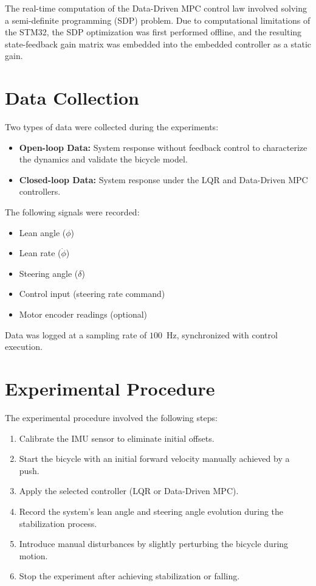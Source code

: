 The real-time computation of the Data-Driven MPC control law involved solving a semi-definite programming (SDP) problem.
Due to computational limitations of the STM32, the SDP optimization was first performed offline, and the resulting state-feedback gain matrix was embedded into the embedded controller as a static gain.

\section{Data Collection}

Two types of data were collected during the experiments:
\begin{itemize}
	\item \textbf{Open-loop Data:} System response without feedback control to characterize the dynamics and validate the bicycle model.
	\item \textbf{Closed-loop Data:} System response under the LQR and Data-Driven MPC controllers.
\end{itemize}

The following signals were recorded:
\begin{itemize}
	\item Lean angle ($\phi$)
	\item Lean rate ($\dot{\phi}$)
	\item Steering angle ($\delta$)
	\item Control input (steering rate command)
	\item Motor encoder readings (optional)
\end{itemize}

Data was logged at a sampling rate of $100$~Hz, synchronized with control execution.

\section{Experimental Procedure}

The experimental procedure involved the following steps:
\begin{enumerate}
	\item Calibrate the IMU sensor to eliminate initial offsets.
	\item Start the bicycle with an initial forward velocity manually achieved by a push.
	\item Apply the selected controller (LQR or Data-Driven MPC).
	\item Record the system's lean angle and steering angle evolution during the stabilization process.
	\item Introduce manual disturbances by slightly perturbing the bicycle during motion.
	\item Stop the experiment after achieving stabilization or falling.
\end{enumerate}

